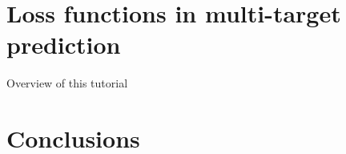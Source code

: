 \documentclass[]{beamer}
\renewcommand{\alert}[1]{\textbf{\color{putblue} #1}}
\begin{document}
\section{Loss functions in multi-target prediction}

\begin{frame}{Overview of this tutorial}

\tableofcontents

\end{frame}






%
%





\section{Conclusions}
\end{document}
